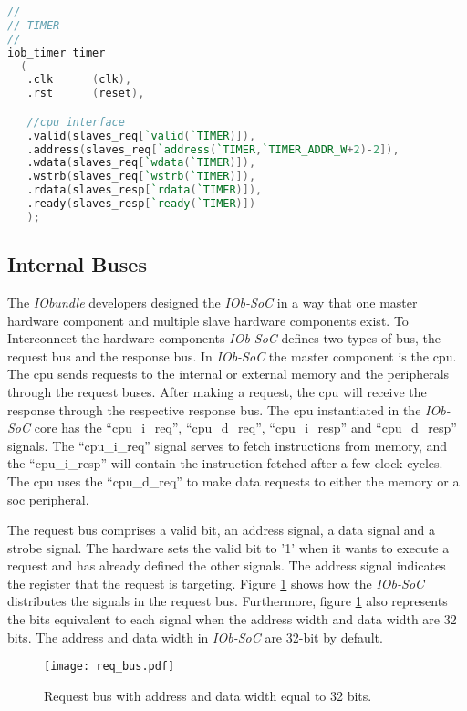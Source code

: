 \begin{lstlisting}[language=Verilog, caption={Example of the \enquote{inst.vh} file.}, label=lst:inst_file]
//
// TIMER
//
iob_timer timer
  (
   .clk      (clk),
   .rst      (reset),

   //cpu interface
   .valid(slaves_req[`valid(`TIMER)]),
   .address(slaves_req[`address(`TIMER,`TIMER_ADDR_W+2)-2]),
   .wdata(slaves_req[`wdata(`TIMER)]),
   .wstrb(slaves_req[`wstrb(`TIMER)]),
   .rdata(slaves_resp[`rdata(`TIMER)]),
   .ready(slaves_resp[`ready(`TIMER)])
   );
\end{lstlisting}

\subsection{Internal Buses}
\label{subsection:iob_bus}
The \textit{IObundle} developers designed the \textit{IOb-SoC} in a way that one master hardware component and multiple slave hardware components exist. To Interconnect the hardware components \textit{IOb-SoC} defines two types of bus, the request bus and the response bus. In \textit{IOb-SoC} the master component is the \acrshort{cpu}. The \acrshort{cpu} sends requests to the internal or external memory and the peripherals through the request buses. After making a request, the \acrshort{cpu} will receive the response through the respective response bus. The \acrshort{cpu} instantiated in the \textit{IOb-SoC} core has the \enquote{cpu\_i\_req}, \enquote{cpu\_d\_req}, \enquote{cpu\_i\_resp} and \enquote{cpu\_d\_resp} signals. The \enquote{cpu\_i\_req} signal serves to fetch instructions from memory, and the \enquote{cpu\_i\_resp} will contain the instruction fetched after a few clock cycles. The \acrshort{cpu} uses the \enquote{cpu\_d\_req} to make data requests to either the memory or a \acrshort{soc} peripheral.

The request bus comprises a valid bit, an address signal, a data signal and a strobe signal. The hardware sets the valid bit to '1' when it wants to execute a request and has already defined the other signals. The address signal indicates the register that the request is targeting. Figure \ref{fig:req_bus} shows how the \textit{IOb-SoC} distributes the signals in the request bus. Furthermore, figure \ref{fig:req_bus} also represents the bits equivalent to each signal when the address width and data width are 32 bits. The address and data width in \textit{IOb-SoC} are 32-bit by default.

\begin{figure}[!ht]
    \centering
    \texttt{[image: req\_bus.pdf]}
    \caption{Request bus with address and data width equal to 32 bits.}
    \label{fig:req_bus}
\end{figure}

